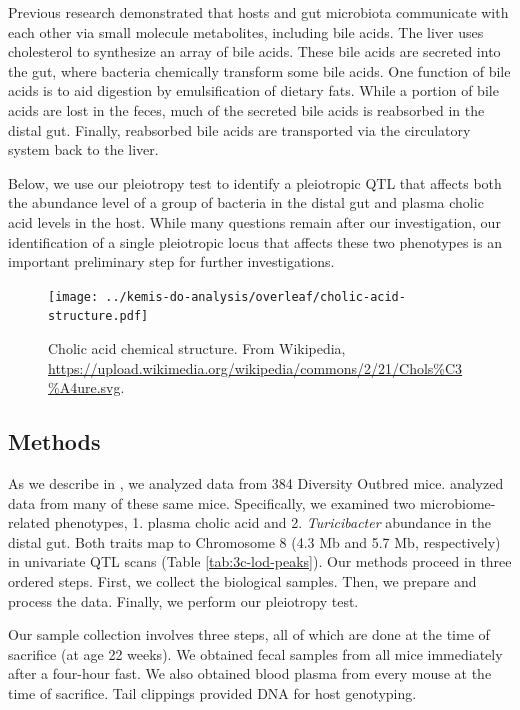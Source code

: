 \documentclass[oneside]{book}\usepackage[]{graphicx}\usepackage[]{color}
\begin{document}
Previous research demonstrated that hosts and gut microbiota communicate 
with each other via small molecule metabolites, including bile acids. 
The liver uses cholesterol to synthesize an array of bile acids. 
These bile acids are secreted into the gut, where bacteria chemically transform some bile acids. 
One function of bile acids is to aid digestion by emulsification of dietary fats. 
While a portion of bile acids are lost in the feces, much of the secreted bile acids is reabsorbed in the distal gut. 
Finally, reabsorbed bile acids are transported via the circulatory system back to the liver.


Below, we use our pleiotropy test to identify a pleiotropic QTL that affects both the 
abundance level of a group of bacteria in the distal gut and plasma cholic acid levels in the host. 
While many questions remain after our investigation, 
our identification of a single pleiotropic locus that affects these two phenotypes 
is an important preliminary step for further investigations.

\begin{figure}
\centering
\texttt{[image: ../kemis-do-analysis/overleaf/cholic-acid-structure.pdf]}
\caption[Cholic acid chemical structure.]{Cholic acid chemical structure. From Wikipedia, \url{https://upload.wikimedia.org/wikipedia/commons/2/21/Chols\%C3\%A4ure.svg}.}\label{fig:cholic-structure}
\end{figure}



\subsection{Methods}

As we describe in \citet{kemis2019genetic}, we analyzed data from 384 Diversity Outbred mice.
\citet{keller2018genetic} analyzed data from many of these same mice. 
Specifically, we examined two microbiome-related phenotypes, 1. plasma cholic acid and 
2. \emph{Turicibacter} abundance in the distal gut. 
Both traits map to Chromosome 8 (4.3 Mb and 5.7 Mb, respectively) in 
univariate QTL scans (Table \ref{tab:3c-lod-peaks}).
Our methods proceed in three ordered steps. 
First, we collect the biological samples. 
Then, we prepare and process the data. 
Finally, we perform our pleiotropy test.

Our sample collection involves three steps, all of which are done at the time of sacrifice (at age 22 weeks). 
We obtained fecal samples from all mice immediately 
after a four-hour fast. 
We also obtained blood plasma from every mouse at the time of sacrifice. 
Tail clippings provided DNA for host genotyping.
\end{document}
